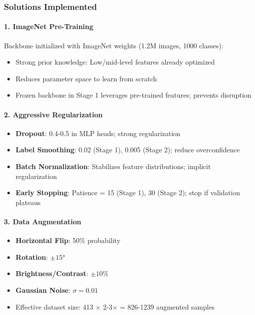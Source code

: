 \documentclass[12pt,a4paper]{article}
\begin{document}
\subsubsection{Solutions Implemented}

\paragraph{1. ImageNet Pre-Training}

Backbone initialized with ImageNet weights (1.2M images, 1000 classes):

\begin{itemize}
    \item Strong prior knowledge: Low/mid-level features already optimized
    \item Reduces parameter space to learn from scratch
    \item Frozen backbone in Stage 1 leverages pre-trained features; prevents disruption
\end{itemize}

\paragraph{2. Aggressive Regularization}

\begin{itemize}
    \item \textbf{Dropout}: 0.4-0.5 in MLP heads; strong regularization
    \item \textbf{Label Smoothing}: 0.02 (Stage 1), 0.005 (Stage 2); reduce overconfidence
    \item \textbf{Batch Normalization}: Stabilizes feature distributions; implicit regularization
    \item \textbf{Early Stopping}: Patience = 15 (Stage 1), 30 (Stage 2); stop if validation plateaus
\end{itemize}

\paragraph{3. Data Augmentation}

\begin{itemize}
    \item \textbf{Horizontal Flip}: 50\% probability
    \item \textbf{Rotation}: $\pm 15°$
    \item \textbf{Brightness/Contrast}: $\pm 10\%$
    \item \textbf{Gaussian Noise}: $\sigma = 0.01$
    \item Effective dataset size: 413 × 2-3× = 826-1239 augmented samples
\end{itemize}
\end{document}
